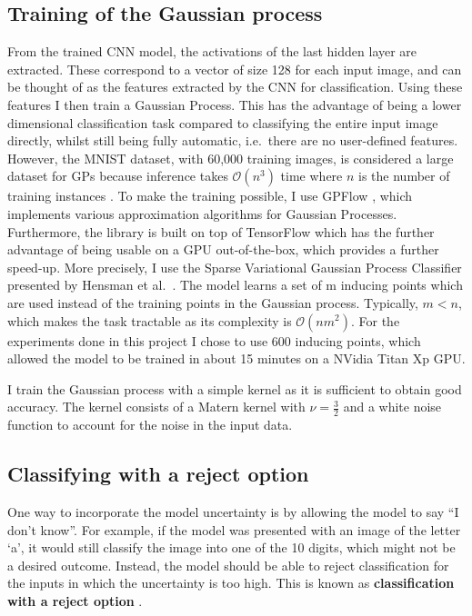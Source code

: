 \documentclass{article}
\begin{document}
\subsection{Training of the Gaussian process}
From the trained CNN model, the activations of the last hidden layer are extracted. These correspond to a vector of size 128 for each input image, and can be thought of as the features extracted by the CNN for classification. Using these features I then train a Gaussian Process. This has the advantage of being a lower dimensional classification task compared to classifying the entire input image directly, whilst still being fully automatic, i.e.\ there are no user-defined features. However, the MNIST dataset, with 60,000 training images, is considered a large dataset for GPs because inference takes $\mathcal{O}(n^3)$ time where $n$ is the number of training instances \cite{hensman2015scalable}. To make the training possible, I use GPFlow \cite{GPflow2017}, which implements various approximation algorithms for Gaussian Processes. Furthermore, the library is built on top of TensorFlow which has the further advantage of being usable on a GPU out-of-the-box, which provides a further speed-up. More precisely, I use the Sparse Variational Gaussian Process Classifier presented by Hensman et al.\ \cite{hensman2015scalable}. The model learns a set of m inducing points which are used instead of the training points in the Gaussian process. Typically, $m < n$, which makes the task tractable as its complexity is $\mathcal{O}(nm^2)$. For the experiments done in this project I chose to use 600 inducing points, which allowed the model to be trained in about 15 minutes on a NVidia Titan Xp GPU.

I train the Gaussian process with a simple kernel as it is sufficient to obtain good accuracy. The kernel consists of a Matern kernel  \cite{rasmussen2006gaussian} with $\nu =\frac{3}{2}$ and a white noise function to account for the noise in the input data.

\subsection{Classifying with a reject option}
\label{section/reject_option}
One way to incorporate the model uncertainty is by allowing the model to say ``I don't know''. For example, if the model was presented with an image of the letter `a', it would still classify the image into one of the 10 digits, which might not be a desired outcome. Instead, the model should be able to reject classification for the inputs in which the uncertainty is too high. This is known as \textbf{classification with a reject option} \cite{chow1970optimum}. 
\end{document}

